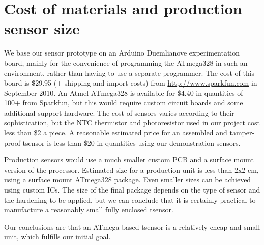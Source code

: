 \section{Cost of materials and production sensor size}

We base our sensor prototype on an Arduino Duemlianove experimentation board, mainly for the convenience of programming the ATmega328 in such an environment, rather than having to use a separate programmer. The cost of this board is \$29.95 (+ shipping and import costs) from \url{http://www.sparkfun.com} in September 2010. An Atmel ATmega328 is available for \$4.40 in quantities of 100+ from Sparkfun, but this would require custom circuit boards and some additional support hardware. The cost of sensors varies according to their sophistication, but the NTC thermistor and photoresistor used in our project cost less than \$2 a piece. A reasonable estimated price for an assembled and tamper-proof tsensor is less than \$20 in quantities using our demonstration sensors. 

Production sensors would use a much smaller custom PCB and a surface mount version of the processor. Estimated size for a production unit is less than 2x2 cm, using a surface mount ATmega328 package. Even smaller sizes can be achieved using custom ICs. The size of the final package depends on the type of sensor and the hardening to be applied, but we can conclude that it is certainly practical to manufacture a reasonably small fully enclosed tsensor. 

Our conclusions are that an ATmega-based tsensor is a relatively cheap and small unit, which fulfills our initial goal.

